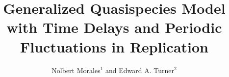 \documentclass[11pt,reqno]{amsart}
\title[Extended Quasispecies with Time Lags and Fluctuations in replication]{Generalized Quasispecies Model with Time Delays and Periodic Fluctuations in Replication}
\author[N. Morales and E. Turner]{{Nolbert Morales$^{1}$\orcidlink{0009-0009-8114-1537} \MakeLowercase{and} Edward A. Turner$^{2}$\orcidlink{0000-0002-2959-9227}}}
\theoremstyle{definition}
\begin{document}

\end{document}
